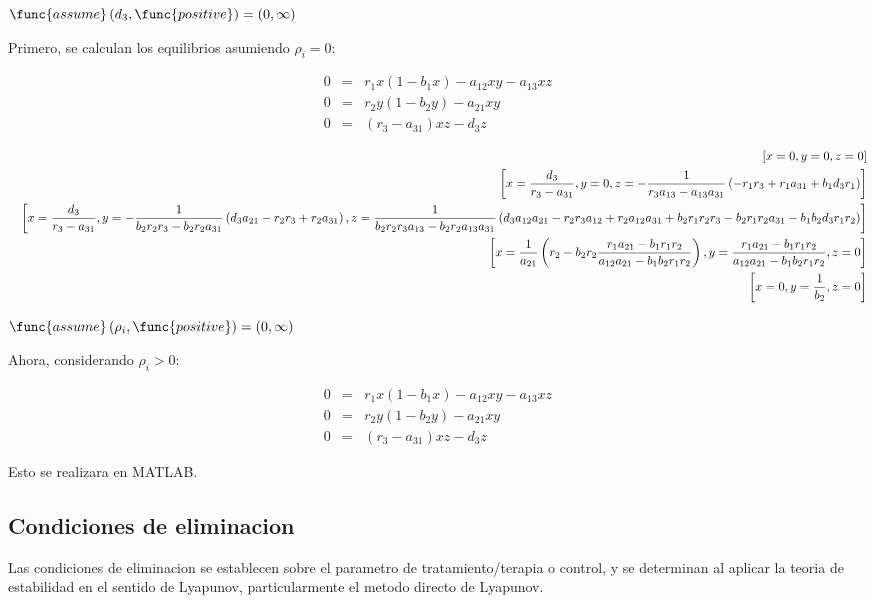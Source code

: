 \documentclass[letterpaper,11pt]{article}
\begin{document}
$\func{assume}\left( d_{3},\func{positive}\right) =\allowbreak \left(
0,\infty \right) $

\bigskip Primero, se calculan los equilibrios asumiendo $\rho _{i}=0:$

\begin{eqnarray*}
0 &=&r_{1}x(1-b_{1}x)-a_{12}xy-a_{13}xz \\
0 &=&r_{2}y(1-b_{2}y)-a_{21}xy \\
0 &=&(r_{3}-a_{31})xz-d_{3}z
\end{eqnarray*}

\begin{eqnarray*}
&&\left[ x=0,y=0,z=0\right]  \\
&&\left[ x=\frac{d_{3}}{r_{3}-a_{31}},y=0,z=-\frac{1}{%
r_{3}a_{13}-a_{13}a_{31}}\left(
-r_{1}r_{3}+r_{1}a_{31}+b_{1}d_{3}r_{1}\right) \right]  \\
&&\left[ x=\frac{d_{3}}{r_{3}-a_{31}},y=-\frac{1}{%
b_{2}r_{2}r_{3}-b_{2}r_{2}a_{31}}\left(
d_{3}a_{21}-r_{2}r_{3}+r_{2}a_{31}\right) ,z=\frac{1}{%
b_{2}r_{2}r_{3}a_{13}-b_{2}r_{2}a_{13}a_{31}}\left(
d_{3}a_{12}a_{21}-r_{2}r_{3}a_{12}+r_{2}a_{12}a_{31}+b_{2}r_{1}r_{2}r_{3}-b_{2}r_{1}r_{2}a_{31}-b_{1}b_{2}d_{3}r_{1}r_{2}\right) %
\right]  \\
&&\left[ x=\frac{1}{a_{21}}\left( r_{2}-b_{2}r_{2}\frac{%
r_{1}a_{21}-b_{1}r_{1}r_{2}}{a_{12}a_{21}-b_{1}b_{2}r_{1}r_{2}}\right) ,y=%
\frac{r_{1}a_{21}-b_{1}r_{1}r_{2}}{a_{12}a_{21}-b_{1}b_{2}r_{1}r_{2}},z=0%
\right]  \\
&&\left[ x=0,y=\frac{1}{b_{2}},z=0\right] 
\end{eqnarray*}

\bigskip $\func{assume}\left( \rho _{i},\func{positive}\right) =\allowbreak
\left( 0,\infty \right) $

Ahora, considerando  $\rho _{i}>0:$

\begin{eqnarray*}
0 &=&r_{1}x(1-b_{1}x)-a_{12}xy-a_{13}xz \\
0 &=&r_{2}y(1-b_{2}y)-a_{21}xy \\
0 &=&(r_{3}-a_{31})xz-d_{3}z
\end{eqnarray*}

Esto se realizara en MATLAB.\bigskip 

\subsection{\protect\bigskip Condiciones de eliminacion}

Las condiciones de eliminacion se establecen sobre el parametro de
tratamiento/terapia o control, y se determinan al aplicar la teoria de
estabilidad en el sentido de Lyapunov, particularmente el metodo directo de
Lyapunov.
\end{document}
